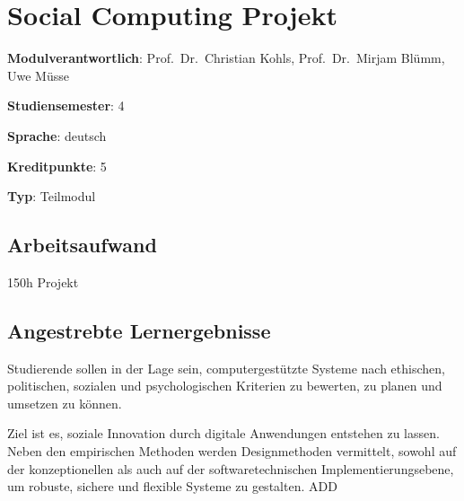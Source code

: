 \hypertarget{social-computing-projektpathlabelmi-2017modulbeschreibungen-bachelorba_sc_projekt}{%
\chapter{Social Computing
Projekt\label{/mi-2017/modulbeschreibungen-bachelor/BA_SC_Projekt}}\label{social-computing-projektpathlabelmi-2017modulbeschreibungen-bachelorba_sc_projekt}}

\begin{modulHead}
\textbf{Modulverantwortlich}: Prof.~Dr.~Christian
Kohls, Prof.~Dr.~Mirjam Blümm, Uwe
Müsse
\end{modulHead}
\begin{modulHead}
\textbf{Studiensemester}:
4
\end{modulHead}
\begin{modulHead}
\textbf{Sprache}:
deutsch
\end{modulHead}
\begin{modulHead}
\textbf{Kreditpunkte}:
5
\end{modulHead}
\begin{modulHead}
\textbf{Typ}:
Teilmodul
\end{modulHead}


\hypertarget{arbeitsaufwandpathlabelmi-2017modulbeschreibungen-bachelorba_sc_projekt}{%
\section*{Arbeitsaufwand\label{/mi-2017/modulbeschreibungen-bachelor/BA_SC_Projekt}}\label{arbeitsaufwandpathlabelmi-2017modulbeschreibungen-bachelorba_sc_projekt}}

150h Projekt

\hypertarget{angestrebte-lernergebnissepathlabelmi-2017modulbeschreibungen-bachelorba_sc_projekt}{%
\section*{Angestrebte
Lernergebnisse\label{/mi-2017/modulbeschreibungen-bachelor/BA_SC_Projekt}}\label{angestrebte-lernergebnissepathlabelmi-2017modulbeschreibungen-bachelorba_sc_projekt}}

Studierende sollen in der Lage sein, computergestützte Systeme nach
ethischen, politischen, sozialen und psychologischen Kriterien zu
bewerten, zu planen und umsetzen zu können.

Ziel ist es, soziale Innovation durch digitale Anwendungen entstehen zu
lassen. Neben den empirischen Methoden werden Designmethoden vermittelt,
sowohl auf der konzeptionellen als auch auf der softwaretechnischen
Implementierungsebene, um robuste, sichere und flexible Systeme zu
gestalten. ADD

